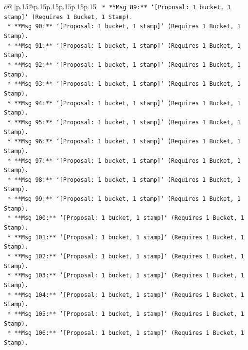 \documentclass{article}
\begin{document}
{\begin{supertabular}{c@{$\;$}|p{.15\linewidth}@{}p{.15\linewidth}p{.15\linewidth}p{.15\linewidth}p{.15\linewidth}p{.15\linewidth}}
{{{\texttt{                *   **Msg 89:** `{[}Proposal: 1 bucket, 1 stamp{]}` (Requires 1 Bucket, 1 Stamp).} \\
\texttt{                *   **Msg 90:** `{[}Proposal: 1 bucket, 1 stamp{]}` (Requires 1 Bucket, 1 Stamp).} \\
\texttt{                *   **Msg 91:** `{[}Proposal: 1 bucket, 1 stamp{]}` (Requires 1 Bucket, 1 Stamp).} \\
\texttt{                *   **Msg 92:** `{[}Proposal: 1 bucket, 1 stamp{]}` (Requires 1 Bucket, 1 Stamp).} \\
\texttt{                *   **Msg 93:** `{[}Proposal: 1 bucket, 1 stamp{]}` (Requires 1 Bucket, 1 Stamp).} \\
\texttt{                *   **Msg 94:** `{[}Proposal: 1 bucket, 1 stamp{]}` (Requires 1 Bucket, 1 Stamp).} \\
\texttt{                *   **Msg 95:** `{[}Proposal: 1 bucket, 1 stamp{]}` (Requires 1 Bucket, 1 Stamp).} \\
\texttt{                *   **Msg 96:** `{[}Proposal: 1 bucket, 1 stamp{]}` (Requires 1 Bucket, 1 Stamp).} \\
\texttt{                *   **Msg 97:** `{[}Proposal: 1 bucket, 1 stamp{]}` (Requires 1 Bucket, 1 Stamp).} \\
\texttt{                *   **Msg 98:** `{[}Proposal: 1 bucket, 1 stamp{]}` (Requires 1 Bucket, 1 Stamp).} \\
\texttt{                *   **Msg 99:** `{[}Proposal: 1 bucket, 1 stamp{]}` (Requires 1 Bucket, 1 Stamp).} \\
\texttt{                *   **Msg 100:** `{[}Proposal: 1 bucket, 1 stamp{]}` (Requires 1 Bucket, 1 Stamp).} \\
\texttt{                *   **Msg 101:** `{[}Proposal: 1 bucket, 1 stamp{]}` (Requires 1 Bucket, 1 Stamp).} \\
\texttt{                *   **Msg 102:** `{[}Proposal: 1 bucket, 1 stamp{]}` (Requires 1 Bucket, 1 Stamp).} \\
\texttt{                *   **Msg 103:** `{[}Proposal: 1 bucket, 1 stamp{]}` (Requires 1 Bucket, 1 Stamp).} \\
\texttt{                *   **Msg 104:** `{[}Proposal: 1 bucket, 1 stamp{]}` (Requires 1 Bucket, 1 Stamp).} \\
\texttt{                *   **Msg 105:** `{[}Proposal: 1 bucket, 1 stamp{]}` (Requires 1 Bucket, 1 Stamp).} \\
\texttt{                *   **Msg 106:** `{[}Proposal: 1 bucket, 1 stamp{]}` (Requires 1 Bucket, 1 Stamp).} \\
}}}
\end{supertabular}}
\end{document}
